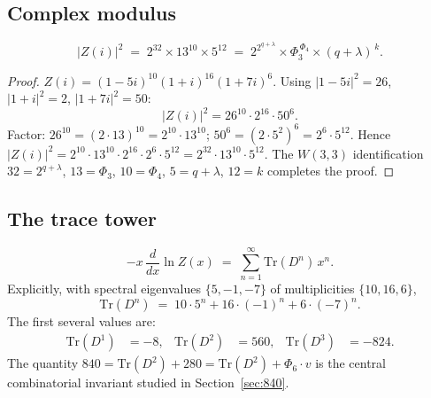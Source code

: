 \subsection{Complex modulus}

\begin{proposition}
\label{prop:Z_modulus}
\begin{equation}
  \label{eq:Z_mod}
  \bigl|Z(i)\bigr|^2 \;=\; 2^{32} \times 13^{10} \times 5^{12}
    \;=\; 2^{2^{q+\lambda}} \times \Phi_3^{\,\Phi_4} \times (q+\lambda)^{\,k}.
\end{equation}
\end{proposition}

\begin{proof}
$Z(i) = (1-5i)^{10}(1+i)^{16}(1+7i)^6$.  Using $|1-5i|^2=26$,
$|1+i|^2=2$, $|1+7i|^2=50$:
\[
  |Z(i)|^2 = 26^{10}\cdot 2^{16}\cdot 50^6.
\]
Factor: $26^{10}=(2\cdot 13)^{10}=2^{10}\cdot 13^{10}$;
$50^6=(2\cdot 5^2)^6=2^6\cdot 5^{12}$.  Hence
$|Z(i)|^2 = 2^{10}\cdot 13^{10}\cdot 2^{16}\cdot 2^6\cdot 5^{12}
= 2^{32}\cdot 13^{10}\cdot 5^{12}$.
The $W(3,3)$ identification $32=2^{q+\lambda}$, $13=\Phi_3$, $10=\Phi_4$,
$5=q+\lambda$, $12=k$ completes the proof.
\end{proof}

\subsection{The trace tower}

\begin{theorem}
\label{thm:trace_tower}
\label{thm:prime-corollary-e6-dimension}
\begin{equation}
  \label{eq:trace_gen}
  -x\,\frac{d}{dx}\ln Z(x) \;=\; \sum_{n=1}^{\infty} \mathrm{Tr}(D^n)\,x^n.
\end{equation}
Explicitly, with spectral eigenvalues $\{5,-1,-7\}$ of multiplicities
$\{10,16,6\}$,
\begin{equation}
  \label{eq:trace_formula}
  \mathrm{Tr}(D^n) \;=\; 10\cdot 5^n + 16\cdot (-1)^n + 6\cdot (-7)^n.
\end{equation}
The first several values are:
\begin{align}
  \mathrm{Tr}(D^1) &= -8, &
  \mathrm{Tr}(D^2) &= 560, &
  \mathrm{Tr}(D^3) &= -824.
\end{align}
The quantity $840 = \mathrm{Tr}(D^2) + 280 = \mathrm{Tr}(D^2) + \Phi_6\cdot v$
is the central combinatorial invariant studied in Section~\ref{sec:840}.
\end{theorem}

